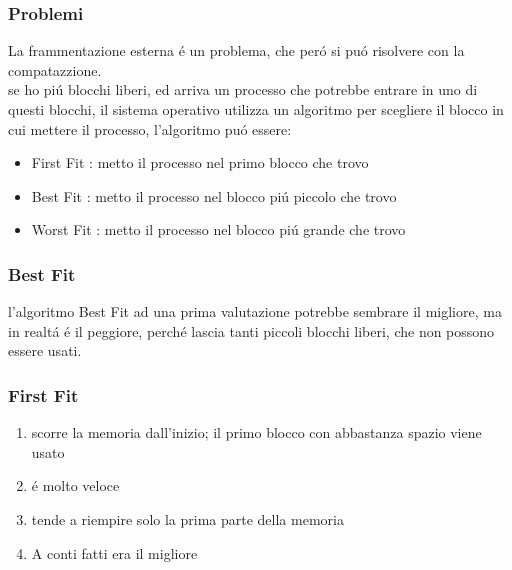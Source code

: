     \subsubsection*{Problemi}
    La frammentazione esterna é un problema, che peró si puó risolvere con la compatazzione. \\

    se ho piú blocchi liberi, ed arriva un processo che potrebbe entrare in uno di questi blocchi, il sistema operativo
    utilizza un algoritmo per scegliere il blocco in cui mettere il processo, l'algoritmo puó essere:
    \begin{itemize}
        \item First Fit : metto il processo nel primo blocco che trovo
        \item Best Fit : metto il processo nel blocco piú piccolo che trovo
        \item Worst Fit : metto il processo nel blocco piú grande che trovo
    \end{itemize}
    \subsubsection*{Best Fit}
    l'algoritmo Best Fit ad una prima valutazione potrebbe sembrare il migliore, ma in realtá é il peggiore, perché
    lascia tanti piccoli blocchi liberi, che non possono essere usati.
    \subsubsection*{First Fit}
    \begin{enumerate}
        \item scorre la memoria dall'inizio; il primo blocco con abbastanza spazio viene usato
        \item é molto veloce
        \item tende a riempire solo la prima parte della memoria
        \item A conti fatti era il migliore
    \end{enumerate}
